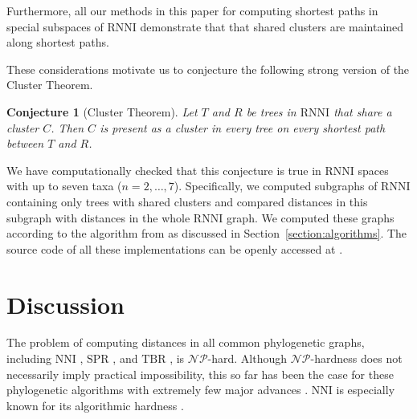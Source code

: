 \documentclass{amsart}
\newcommand{\np}{\mathcal{NP}}
\newcommand{\nni}{\mathrm{NNI}}
\newcommand{\rnni}{\mathrm{RNNI}}
\newcommand{\tbr}{\mathrm{TBR}}
\newcommand{\spr}{\mathrm{SPR}}
\newtheorem{conjecture}[definition]{Conjecture}
\begin{document}
Furthermore, all our methods in this paper for computing shortest paths in special subspaces of $\rnni$ demonstrate that that shared clusters are maintained along shortest paths.

These considerations motivate us to conjecture the following strong version of the Cluster Theorem.

\begin{conjecture}[Cluster Theorem]
Let $T$ and $R$ be trees in $\rnni$ that share a cluster $C$.
Then $C$ is present as a cluster in every tree on every shortest path between $T$ and $R$.
\label{conjecture:cluster_theorem}
\end{conjecture}

We have computationally checked that this conjecture is true in $\rnni$ spaces with up to seven taxa ($n = 2, \ldots, 7$).
Specifically, we computed subgraphs of $\rnni$ containing only trees with shared clusters and compared distances in this subgraph with distances in the whole $\rnni$ graph.
We computed these graphs according to the algorithm from \autocite{Gavryushkin2018-ol} as discussed in Section~\ref{section:algorithms}.
The source code of all these implementations can be openly accessed at \autocite{Collienne2019}.


\section{Discussion}

The problem of computing distances in all common phylogenetic graphs, including $\nni$ \autocite{Dasgupta2000-xa}, $\spr$ \autocite{Bordewich2005-nx}, and $\tbr$ \autocite{Allen2001-ky}, is $\np$-hard.
Although $\np$-hardness does not necessarily imply practical impossibility, this so far has been the case for these phylogenetic algorithms with extremely few major advances \autocite{Whidden2010-bw}.
$\nni$ is especially known for its algorithmic hardness \autocite{Whidden2018-fw}.
\end{document}
